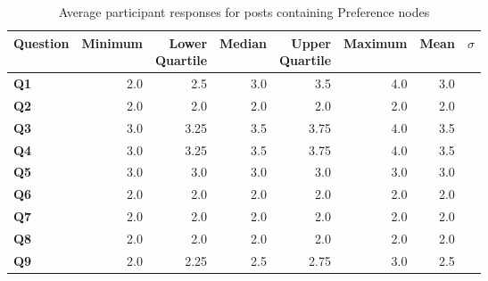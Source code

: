 \begin{table}
\centering
\caption{Average participant responses for posts containing Preference nodes}
\label{table:perception:preference-average}
\begin{tabular}{ l | r | r | r | r | r | r | r}
\textbf{Question} & \textbf{Minimum} & \pbox{2cm}{\textbf{Lower}\\ \textbf{Quartile}} & \textbf{Median} & \pbox{2cm}{\textbf{Upper}\\ \textbf{Quartile}} & \textbf{Maximum} & \textbf{Mean} & \textbf{$\sigma$}\\
\hline
\textbf{Q1} &  2.0 & 2.5 & 3.0 & 3.5 & 4.0 & 3.0 &  \\
\hline
\textbf{Q2} &  2.0 & 2.0 & 2.0 & 2.0 & 2.0 & 2.0 &  \\
\hline
\textbf{Q3} &  3.0 & 3.25 & 3.5 & 3.75 & 4.0 & 3.5 &  \\
\hline
\textbf{Q4} &  3.0 & 3.25 & 3.5 & 3.75 & 4.0 & 3.5 &  \\
\hline
\textbf{Q5} &  3.0 & 3.0 & 3.0 & 3.0 & 3.0 & 3.0 &  \\
\hline
\textbf{Q6} &  2.0 & 2.0 & 2.0 & 2.0 & 2.0 & 2.0 &  \\
\hline
\textbf{Q7} &  2.0 & 2.0 & 2.0 & 2.0 & 2.0 & 2.0 &  \\
\hline
\textbf{Q8} &  2.0 & 2.0 & 2.0 & 2.0 & 2.0 & 2.0 &  \\
\hline
\textbf{Q9} &  2.0 & 2.25 & 2.5 & 2.75 & 3.0 & 2.5 &  \\
\end{tabular}
\end{table}




